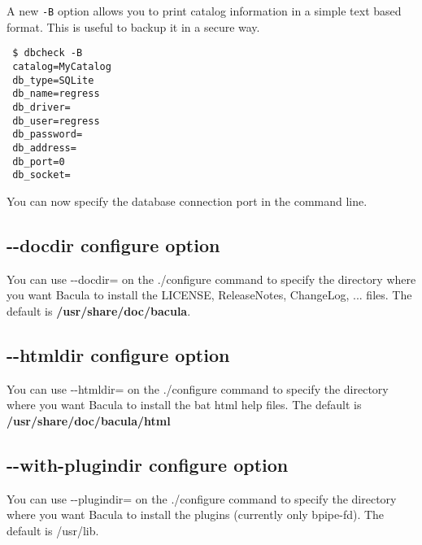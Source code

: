 A new \texttt{-B} option allows you to print catalog information in a simple
text based format. This is useful to backup it in a secure way.

\begin{verbatim}
 $ dbcheck -B 
 catalog=MyCatalog
 db_type=SQLite
 db_name=regress
 db_driver=
 db_user=regress
 db_password=
 db_address=
 db_port=0
 db_socket=
\end{verbatim} %

You can now specify the database connection port in the command line.

\subsection{{-}{-}docdir configure option}
You can use {-}{-}docdir= on the ./configure command to
specify the directory where you want Bacula to install the
LICENSE, ReleaseNotes, ChangeLog, ... files.   The default is 
{\bf /usr/share/doc/bacula}.
      
\subsection{{-}{-}htmldir configure option}
You can use {-}{-}htmldir= on the ./configure command to
specify the directory where you want Bacula to install the bat html help
files. The default is {\bf /usr/share/doc/bacula/html}

\subsection{{-}{-}with-plugindir configure option}
You can use {-}{-}plugindir= on the ./configure command to
specify the directory where you want Bacula to install
the plugins (currently only bpipe-fd). The default is
/usr/lib.
